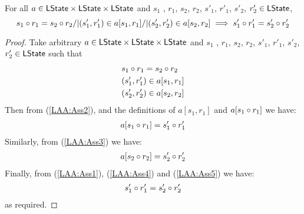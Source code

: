 %
%
%
\begin{lemma}\label{lem:action-application}
%
For all $a \in \textsf{LState} \times \textsf{LState} \times \textsf{LState}$ and $s_1$ , $r_1$, $s_2$, $r_2$, $s'_1$, $r'_1$, $s'_2$, $r'_2 \in \textsf{LState}$,
\[
	s_1 \circ r_1 = s_2 \circ r_2 /| (s'_1, r'_1) \in a[s_1, r_1] /| (s'_2, r'_2) \in a[s_2, r_2] \implies s'_1 \circ r'_1 = s'_2 \circ r'_2 
\]
%
\begin{proof}
Take arbitrary $a \in \textsf{LState} \times \textsf{LState} \times \textsf{LState}$ and $s_1$ , $r_1$, $s_2$, $r_2$, $s'_1$, $r'_1$, $s'_2$, $r'_2 \in \textsf{LState}$ such that 
%
\begin{align}
	& s_1 \circ r_1 = s_2 \circ r_2 \label{LAA:Ass1}\\
	& (s'_1, r'_1) \in a[s_1, r_1] \label{LAA:Ass2}\\
	& (s'_2, r'_2) \in a[s_2, r_2] \label{LAA:Ass3}
\end{align}
%
Then from (\ref{LAA:Ass2}), and the definitions of $a[s_1, r_1]$ and $a[s_1 \circ r_1]$ we have:
%
\begin{align}
	a[s_1 \circ r_1] = s'_1 \circ r'_1 \label{LAA:Ass4}
\end{align}
%
Similarly, from (\ref{LAA:Ass3}) we have:
%
\begin{align}
	a[s_2 \circ r_2] = s'_2 \circ r'_2 \label{LAA:Ass5}
\end{align}
%
Finally, from (\ref{LAA:Ass1}), (\ref{LAA:Ass4}) and (\ref{LAA:Ass5}) we have:
%
\begin{align*}
	s'_1 \circ r'_1 = s'_2 \circ r'_2 
\end{align*}
%
as required.
\end{proof}
%
\end{lemma}
%
%
